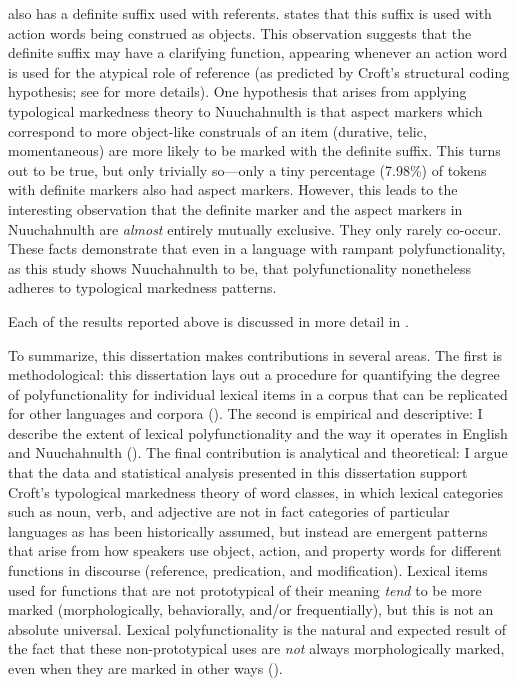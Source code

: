  also has a definite suffix  used with referents. \textcite[48]{Nakayama2001} states that this suffix is used with action words being construed as objects. This observation suggests that the definite suffix may have a clarifying function, appearing whenever an action word is used for the atypical role of reference (as predicted by Croft's structural coding hypothesis; see  for more details). One hypothesis that arises from applying typological markedness theory to Nuuchahnulth is that aspect markers which correspond to more object-like construals of an item (durative, telic, momentaneous) are more likely to be marked with the definite suffix. This turns out to be true, but only trivially so—only a tiny percentage (7.98\%) of tokens with definite markers also had aspect markers. However, this leads to the interesting observation that the definite marker and the aspect markers in Nuuchahnulth are \emph{almost} entirely mutually exclusive. They only rarely co-occur. These facts demonstrate that even in a language with rampant polyfunctionality, as this study shows Nuuchahnulth to be, that polyfunctionality nonetheless adheres to typological markedness patterns.

Each of the results reported above is discussed in more detail in .

To summarize, this dissertation makes contributions in several areas. The first is methodological: this dissertation lays out a procedure for quantifying the degree of polyfunctionality for individual lexical items in a corpus that can be replicated for other languages and corpora (). The second is empirical and descriptive: I describe the extent of lexical polyfunctionality and the way it operates in English and Nuuchahnulth (). The final contribution is analytical and theoretical: I argue that the data and statistical analysis presented in this dissertation support Croft's typological markedness theory of word classes, in which lexical categories such as noun, verb, and adjective are not in fact categories of particular languages as has been historically assumed, but instead are emergent patterns that arise from how speakers use object, action, and property words for different functions in discourse (reference, predication, and modification). Lexical items used for functions that are not prototypical of their meaning \emph{tend} to be more marked (morphologically, behaviorally, and/or frequentially), but this is not an absolute universal. Lexical polyfunctionality is the natural and expected result of the fact that these non-prototypical uses are \emph{not} always morphologically marked, even when they are marked in other ways ().

